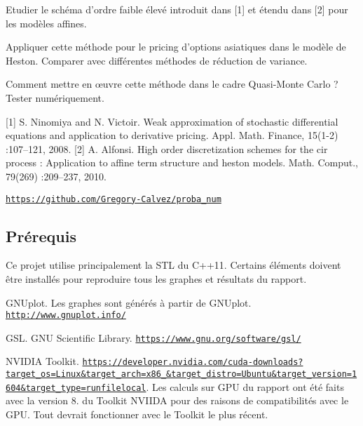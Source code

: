 Etudier le schéma d’ordre faible élevé introduit dans \mbox{[}1\mbox{]} et étendu dans \mbox{[}2\mbox{]} pour les modèles affines.
\begin{DoxyItemize}
\item Appliquer cette méthode pour le pricing d’options asiatiques dans le modèle de Heston. Comparer avec différentes méthodes de réduction de variance.
\item Comment mettre en œuvre cette méthode dans le cadre Quasi-\/\+Monte Carlo ? Tester numériquement.
\end{DoxyItemize}

\mbox{[}1\mbox{]} S. Ninomiya and N. Victoir. Weak approximation of stochastic differential equations and application to derivative pricing. Appl. Math. Finance, 15(1-\/2) \+:107–121, 2008. \mbox{[}2\mbox{]} A. Alfonsi. High order discretization schemes for the cir process \+: Application to affine term structure and heston models. Math. Comput., 79(269) \+:209–237, 2010.

\href{https://github.com/Gregory-Calvez/proba_num}{\tt https\+://github.\+com/\+Gregory-\/\+Calvez/proba\+\_\+num}

\subsection*{Prérequis}

Ce projet utilise principalement la S\+TL du C++11. Certains éléments doivent être installés pour reproduire tous les graphes et résultats du rapport.
\begin{DoxyItemize}
\item G\+N\+Uplot. Les graphes sont générés à partir de G\+N\+Uplot. \href{http://www.gnuplot.info/}{\tt http\+://www.\+gnuplot.\+info/}
\item G\+SL. G\+NU Scientific Library. \href{https://www.gnu.org/software/gsl/}{\tt https\+://www.\+gnu.\+org/software/gsl/}
\item N\+V\+I\+D\+IA Toolkit. \href{https://developer.nvidia.com/cuda-downloads?target_os=Linux&target_arch=x86_64&target_distro=Ubuntu&target_version=1604&target_type=runfilelocal}{\tt https\+://developer.\+nvidia.\+com/cuda-\/downloads?target\+\_\+os=\+Linux\&target\+\_\+arch=x86\+\_\&target\+\_\+distro=\+Ubuntu\&target\+\_\+version=1604\&target\+\_\+type=runfilelocal}. Les calculs sur G\+PU du rapport ont été faits avec la version 8. du Toolkit N\+V\+I\+I\+DA pour des raisons de compatibilités avec le G\+PU. Tout devrait fonctionner avec le Toolkit le plus récent.
\end{DoxyItemize}

